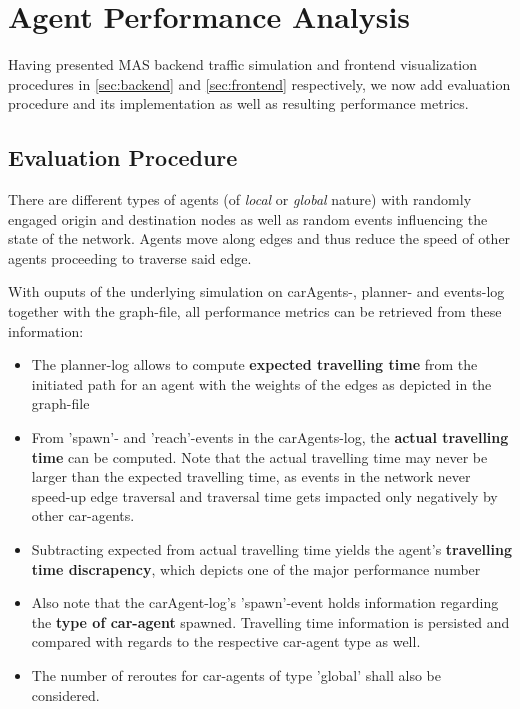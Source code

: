 \section{Agent Performance Analysis}\label{sec:performanceAnalysis}

Having presented MAS backend traffic simulation and frontend visualization procedures in \autoref{sec:backend} and \autoref{sec:frontend} respectively, we now add evaluation procedure and its implementation as well as resulting performance metrics.


\subsection{Evaluation Procedure}

There are different types of agents (of \textit{local} or \textit{global} nature) with randomly engaged origin and destination nodes as well as random events influencing the state of the network. Agents move along edges and thus reduce the speed of other agents proceeding to traverse said edge.

With ouputs of the underlying simulation on carAgents-, planner- and events-log together with the graph-file, all performance metrics can be retrieved from these information:
\begin{itemize}
    \item The planner-log allows to compute \textbf{expected travelling time} from the initiated path for an agent with the weights of the edges as depicted in the graph-file
    \item From 'spawn'- and 'reach'-events in the carAgents-log, the \textbf{actual travelling time} can be computed. Note that the actual travelling time may never be larger than the expected travelling time, as events in the network never speed-up edge traversal and traversal time gets impacted only negatively by other car-agents.
    \item Subtracting expected from actual travelling time yields the agent's \textbf{travelling time discrapency}, which depicts one of the major performance number
    \item Also note that the carAgent-log's 'spawn'-event holds information regarding the \textbf{type of car-agent} spawned. Travelling time information is persisted and compared with regards to the respective car-agent type as well.
    \item The number of reroutes for car-agents of type 'global' shall also be considered. 
\end{itemize}


